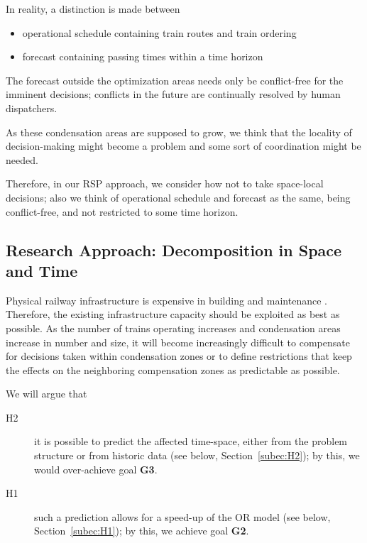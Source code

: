 \documentclass{article}
\begin{document}
In reality, a distinction is made between
\begin{itemize}
    \item     operational schedule containing train routes and train ordering
    \item    forecast containing passing times within a time horizon
\end{itemize}

The forecast outside the optimization areas needs only be conflict-free for the imminent decisions; conflicts in the future are continually resolved by human dispatchers.

As these condensation areas are supposed to grow, we think that the locality of decision-making might become a problem and some sort of coordination might be needed.

Therefore, in our RSP approach, we consider how not to take space-local decisions; also we think of operational schedule and forecast as the same, being conflict-free, and not restricted to some time horizon.

\subsection{Research Approach: Decomposition in Space and Time}
Physical railway infrastructure is expensive in building and maintenance \cite{sr40programm}.
Therefore, the existing infrastructure capacity should be exploited as best as possible.
As the number of trains operating increases and condensation areas increase in number and size, it will become increasingly difficult to compensate for decisions taken within condensation zones or to define restrictions that keep the effects on the neighboring compensation zones as predictable as possible.

We will argue that
\begin{description}
\item [H2] it is possible to predict the affected time-space, either from the problem structure or from historic data (see below, Section~\ref{subec:H2}); by this, we would over-achieve goal \textbf{G3}.
\item [H1] such a prediction allows for a speed-up of the OR model (see below, Section~\ref{subec:H1}); by this, we achieve goal \textbf{G2}.
\end{description}
\end{document}
